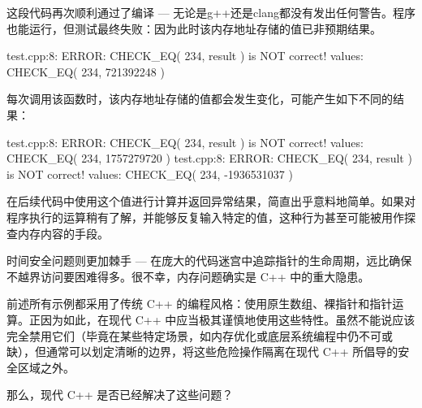 这段代码再次顺利通过了编译 --- 无论是g++还是clang都没有发出任何警告。程序也能运行，但测试最终失败：因为此时该内存地址存储的值已非预期结果。

\begin{shell}
test.cpp:8: ERROR: CHECK_EQ( 234, result ) is NOT correct!
  values: CHECK_EQ( 234, 721392248 )
\end{shell}

每次调用该函数时，该内存地址存储的值都会发生变化，可能产生如下不同的结果：

\begin{shell}
test.cpp:8: ERROR: CHECK_EQ( 234, result ) is NOT correct!
  values: CHECK_EQ( 234, 1757279720 )
test.cpp:8: ERROR: CHECK_EQ( 234, result ) is NOT correct!
  values: CHECK_EQ( 234, -1936531037 )
\end{shell}

在后续代码中使用这个值进行计算并返回异常结果，简直出乎意料地简单。如果对程序执行的运算稍有了解，并能够反复输入特定的值，这种行为甚至可能被用作探查内存内容的手段。

时间安全问题则更加棘手 --- 在庞大的代码迷宫中追踪指针的生命周期，远比确保不越界访问要困难得多。很不幸，内存问题确实是 C++ 中的重大隐患。

前述所有示例都采用了传统 C++ 的编程风格：使用原生数组、裸指针和指针运算。正因为如此，在现代 C++ 中应当极其谨慎地使用这些特性。虽然不能说应该完全禁用它们（毕竟在某些特定场景，如内存优化或底层系统编程中仍不可或缺），但通常可以划定清晰的边界，将这些危险操作隔离在现代 C++ 所倡导的安全区域之外。

那么，现代 C++ 是否已经解决了这些问题？